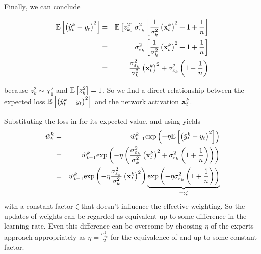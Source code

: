 Finally, we can conclude

\begin{eqnarray}
    \mathbb{E}\left[ \left(\hat y_t^k - y_t\right)^2 \right] & = & \mathbb{E}\left[ z_k^2 \right]\sigma_{\varepsilon_k}^2 \left[ \frac{1}{\sigma_k^{2}}\left({\bf x}_t^k\right)^2 + 1 + \frac{1}{n} \right]\label{EQ:ErrorDistribution4} \\
    & = & \sigma_{\varepsilon_k}^2 \left[ \frac{1}{\sigma_k^{2}}\left({\bf x}_t^k\right)^2 + 1 + \frac{1}{n} \right]\label{EQ:ErrorDistribution4} \\
    & = & \frac{\sigma_{\varepsilon_k}^2 }{\sigma_k^{2}}\left({\bf x}_t^k\right)^2 + \sigma_{\varepsilon_k}^2\left(1 + \frac{1}{n} \right)\label{EQ:ErrorDistribution5} 
\end{eqnarray}

because $z_k^2 \sim \chi^2_1$ and $\mathbb{E}\left[ z_k^2 \right] = 1$. So we find a direct relationship between the expected loss $\mathbb{E}\left[ \left(\hat y_t^k - y_t\right)^2 \right]$ and the network activation ${\bf x}_t^k$.

Substituting the loss in  for its expected value, and using  yields
\begin{eqnarray}
    \tilde w_t^k & = & \tilde w_{t-1}^{k}\text{exp}\left( -\eta \mathbb{E}\left[ \left(\hat y_t^k - y_t\right)^2 \right] \right) \\
    & = & \tilde w_{t-1}^{k} \text{exp}\left( -\eta \left( \frac{\sigma_{\varepsilon_k}^2}{\sigma_k^{2}} \left({\bf x}_t^k\right)^2 + \sigma_{\varepsilon_k}^2\left(1 + \frac{1}{n} \right) \right)  \right) \\
    & = & \tilde w_{t-1}^{k} \text{exp}\left( -\eta        \frac{\sigma_{\varepsilon_k}^2}{\sigma_k^{2}} \left({\bf x}_t^k\right)^2  \right) \underbrace{\text{exp}\left( -\eta \sigma_{\varepsilon_k}^2\left(1 + \frac{1}{n} \right) \right)}_{=: \zeta} \label{EQ:ExpertVSPlasticity}
\end{eqnarray}
with a constant factor $\zeta$ that doesn't influence the effective weighting. So the updates of weights can be regarded as equivalent up to some difference in the learning rate. Even this difference can be overcome by choosing $\eta$ of the experts approach appropriately as $\eta = \frac{\sigma_{\varepsilon_k}^2}{2}$ for the equivalence of  and  up to some constant factor.

